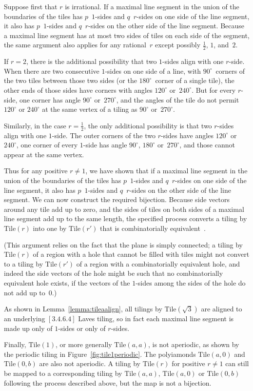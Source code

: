 Suppose first that $r$ is irrational. 
If a maximal line segment in the union of the
boundaries of the tiles has $p$~$1$-sides and $q$~$r$-sides on one
side of the line segment, it also has $p$~$1$-sides and $q$~$r$-sides
on the other side of the line segment. Because a maximal line segment
has at most two sides of tiles on each side of the segment, the same
argument also applies for any rational~$r$ except possibly $\frac{1}{2}$, $1$,
and~$2$.

If $r = 2$, there is the additional possibility that two $1$-sides
align with one $r$-side.  When there are two consecutive $1$-sides on
one side of a line, with $90^\circ$~corners of the two tiles between
those two sides (or the $180^\circ$~corner of a single tile), the
other ends of those sides have corners with angles $120^\circ$
or~$240^\circ$.  But for every $r$-side, one corner has angle
$90^\circ$ or~$270^\circ$, and the angles of the tile do not permit
$120^\circ$ or $240^\circ$ at the same vertex of a tiling as
$90^\circ$ or~$270^\circ$.

Similarly, in the case $r = \frac{1}{2}$, the only additional
possibility is that two $r$-sides align with one $1$-side.  The outer
corners of the two $r$-sides have angles $120^\circ$ or~$240^\circ$,
one corner of every $1$-side has angle $90^\circ$, $180^\circ$
or~$270^\circ$, and those cannot appear at the same vertex.

Thus for any positive $r\ne 1$, we have shown that if a maximal line segment 
in the union of the boundaries of the tiles has $p$~$1$-sides and
$q$~$r$-sides on one side of the line segment, it also has
$p$~$1$-sides and $q$~$r$-sides on the other side of the line segment.
We can now construct the required bijection.  Because side vectors
around any tile add up to zero, and
the sides of tiles on both sides of a maximal line segment add up to
the same length, the specified process converts a tiling by $\mathrm{Tile}(r)$ into one
by $\mathrm{Tile}(r')$ that is combinatorially equivalent~\cite[Lemma~1.1]{regprod}.

(This argument relies on the fact that the plane is simply connected;
a tiling by $\mathrm{Tile}(r)$ of a region with a hole that cannot be filled
with tiles might not convert to a tiling by $\mathrm{Tile}(r')$ of a region with
a combinatorially equivalent hole, and indeed the side vectors of the
hole might be such that no combinatorially equivalent hole exists, if
the vectors of the $1$-sides among the sides of the hole do not add up
to~$0$.)

As shown in Lemma~\ref{lemma:tileaalign}, all tilings by
$\mathrm{Tile}(\sqrt{3})$ are aligned to an underlying $[3.4.6.4]$ Laves tiling,
so in fact each maximal line segment is made up only of $1$-sides or
only of $r$-sides.

Finally, $\mathrm{Tile}(1)$, or more generally $\mathrm{Tile}(a, a)$, is not aperiodic, as shown by the periodic tiling in
Figure~\ref{fig:tile1periodic}.  The polyiamonds $\mathrm{Tile}(a, 0)$ and
$\mathrm{Tile}(0, b)$ are also not aperiodic.  A tiling by $\mathrm{Tile}(r)$ for
positive $r\ne 1$ can still be mapped to a corresponding tiling by
$\mathrm{Tile}(a, a)$, $\mathrm{Tile}(a, 0)$ or $\mathrm{Tile}(0, b)$ following the process
described above, but the map is not a bijection.
